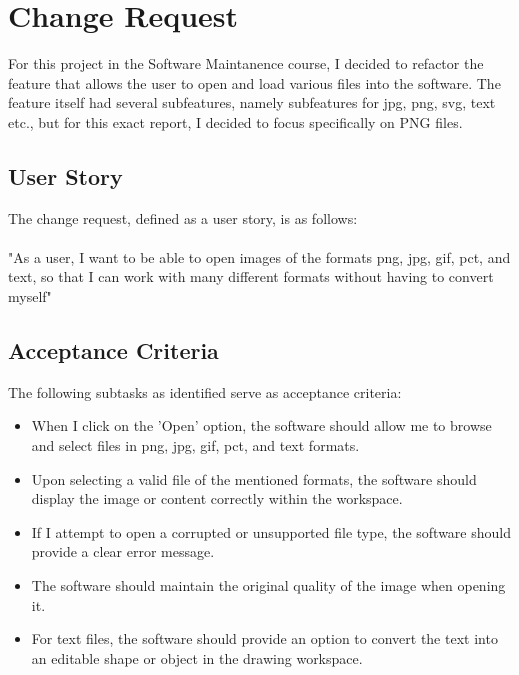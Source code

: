 \section{Change Request}
For this project in the Software Maintanence course, I decided to refactor the feature that allows the user to open and load various files into the software. The feature itself had several subfeatures, namely subfeatures for jpg, png, svg, text etc., but for this exact report, I decided to focus specifically on PNG files.

\subsection{User Story}
The change request, defined as a user story, is as follows:
\\\\
"As a user, I want to be able to open images of the formats png, jpg, gif, pct, and text, so that I can work with many different formats without having to convert myself"

\subsection{Acceptance Criteria}
The following subtasks as identified serve as acceptance criteria:


\begin{itemize}
    \item When I click on the 'Open' option, the software should allow me to browse and select files in png, jpg, gif, pct, and text formats.
    \item Upon selecting a valid file of the mentioned formats, the software should display the image or content correctly within the workspace.
    \item If I attempt to open a corrupted or unsupported file type, the software should provide a clear error message.
    \item The software should maintain the original quality of the image when opening it.
    \item For text files, the software should provide an option to convert the text into an editable shape or object in the drawing workspace.
\end{itemize}
